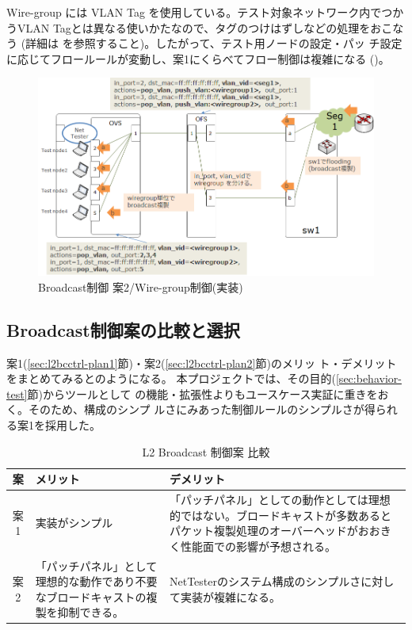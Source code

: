 Wire-group には VLAN Tag を使用している。テスト対象ネットワーク内でつか
うVLAN Tagとは異なる使いかたなので、タグのつけはずしなどの処理をおこなう
(詳細は \lopjtech を参照すること)。したがって、テスト用ノードの設定・パッ
チ設定に応じてフロールールが変動し、案1にくらべてフロー制御は複雑になる
()。

\begin{figure}[h]
 \centering
 \includegraphics[scale=0.6]{img/l2bcctrl_plan2_implement.png}
 \caption{Broadcast制御 案2/Wire-group制御(実装)}
 \label{fig:l2bcctrl_plan2_implement}
\end{figure}

  \subsection{Broadcast制御案の比較と選択}
  \label{sec:l2bcctrl-compare}

案1(\ref{sec:l2bcctrl-plan1}節)・案2(\ref{sec:l2bcctrl-plan2}節)のメリッ
ト・デメリットをまとめてみるとのようになる。
本プロジェクトでは、その目的(\ref{sec:behavior-test}節)からツールとして
の機能・拡張性よりもユースケース実証に重きをおく。そのため、構成のシンプ
ルさにみあった制御ルールのシンプルさが得られる案1を採用した。

\begin{table}[h]
 \caption{L2 Broadcast 制御案 比較}
 \label{tab:l2bcctrl_compare}
 \centering
 \begin{tabularx}{\linewidth}{c|X|X}
  \hline
  案 & メリット & デメリット \\ \hline
  \hline
  案1 & 実装がシンプル
      & 「パッチパネル」としての動作としては理想的ではない。ブロードキャストが多数あるとパケット複製処理のオーバーヘッドがおおきく性能面での影響が予想される。 \\ \hline
  案2 & 「パッチパネル」として理想的な動作であり不要なブロードキャストの複製を抑制できる。
      & NetTesterのシステム構成のシンプルさに対して実装が複雑になる。 \\ \hline
 \end{tabularx}
 \end{table}

